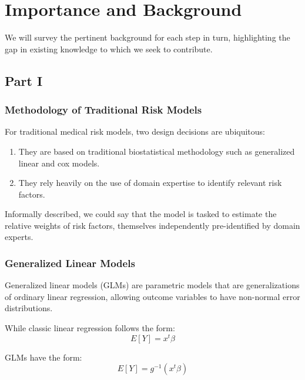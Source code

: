\documentclass[a4paper,12pt]{article}
\begin{document}
	\section{Importance and Background}
	
	We will survey the pertinent background for each step in turn, highlighting the gap in existing knowledge to which we seek to contribute.
	
		\subsection{Part I}
		
			\subsubsection{Methodology of Traditional Risk Models}
		
			For traditional medical risk models, two design decisions are ubiquitous\cite{Weng2017}:
			\begin{enumerate}
				\item They are based on traditional biostatistical methodology such as generalized linear and cox models.
				\item They rely heavily on the use of domain expertise to identify relevant risk factors.
			\end{enumerate}
		
			Informally described, we could say that the model is tasked to estimate the relative weights of risk factors, themselves independently pre-identified by domain experts.
		
			\subsubsection{Generalized Linear Models}
			
			Generalized linear models (GLMs) are parametric models that are generalizations of ordinary linear regression, allowing outcome variables to have non-normal error distributions\cite{Nelder1972}.
			
			While classic linear regression follows the form:
			\begin{equation*}
			E[Y] = x^t \beta
			\end{equation*}
			
			GLMs have the form:
			\begin{equation*}
			E[Y] = g^{-1} (x^t \beta)
			\end{equation*}
			
\end{document}
